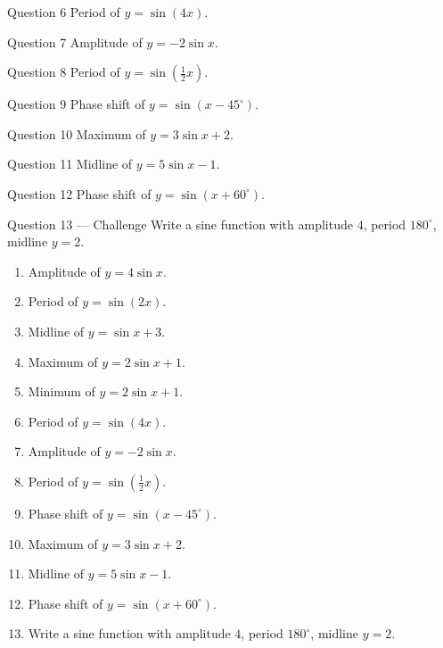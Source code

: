 \documentclass[11pt]{article}
\begin{document}
\begin{qbox}{Question 6}
Period of $y=\sin(4x)$.\workspace{2.4cm}
\end{qbox}

\begin{qbox}{Question 7}
Amplitude of $y=-2\sin x$.\workspace{2.4cm}
\end{qbox}

\begin{qbox}{Question 8}
Period of $y=\sin(\tfrac12 x)$.\workspace{2.4cm}
\end{qbox}

\begin{qbox}{Question 9}
Phase shift of $y=\sin(x-45^\circ)$.\workspace{2.4cm}
\end{qbox}

\begin{qbox}{Question 10}
Maximum of $y=3\sin x+2$.\workspace{2.4cm}
\end{qbox}

\begin{qbox}{Question 11}
Midline of $y=5\sin x-1$.\workspace{2.4cm}
\end{qbox}

\begin{qbox}{Question 12}
Phase shift of $y=\sin(x+60^\circ)$.\workspace{2.4cm}
\end{qbox}

\begin{qbox}{Question 13 --- Challenge}
Write a sine function with amplitude $4$, period $180^\circ$, midline $y=2$.\workspace{3cm}
\end{qbox}

\clearpage
{}

\begin{recapbox}
\begin{multicols}{2}
\small
\begin{enumerate}[leftmargin=*,itemsep=3pt]
  \item Amplitude of $y=4\sin x$.
  \item Period of $y=\sin(2x)$.
  \item Midline of $y=\sin x+3$.
  \item Maximum of $y=2\sin x+1$.
  \item Minimum of $y=2\sin x+1$.
  \item Period of $y=\sin(4x)$.
  \item Amplitude of $y=-2\sin x$.
  \item Period of $y=\sin(\tfrac12 x)$.
  \item Phase shift of $y=\sin(x-45^\circ)$.
  \item Maximum of $y=3\sin x+2$.
  \item Midline of $y=5\sin x-1$.
  \item Phase shift of $y=\sin(x+60^\circ)$.
  \item Write a sine function with amplitude $4$, period $180^\circ$, midline $y=2$.
\end{enumerate}
\end{multicols}
\end{recapbox}
\end{document}
